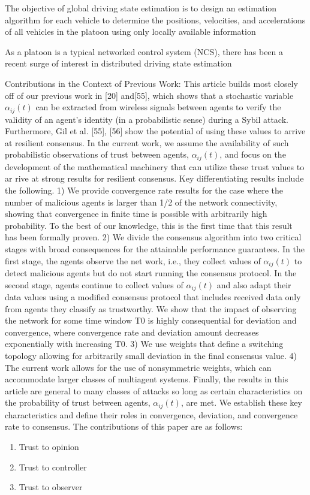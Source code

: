 \documentclass[letterpaper, 10pt, conference]{ieeeconf}  %
\begin{document}
 The objective of global driving state
 estimation is to design an estimation algorithm for each vehicle
 to determine the positions, velocities, and accelerations of all
 vehicles in the platoon using only locally available information

 As a platoon is a typical networked control system (NCS),
 there has been a recent surge of interest in distributed driving
 state estimation

    
Contributions in the Context of Previous Work: This article builds most closely off of our previous work in [20] and[55], which shows that a stochastic variable $\alpha_{ij}(t)$ can be extracted
 from wireless signals between agents to verify the validity of an
 agent's identity (in a probabilistic sense) during a Sybil attack.
 Furthermore, Gil et al. [55], [56] show the potential of using
 these values to arrive at resilient consensus. In the current work,
 we assume the availability of such probabilistic observations of
 trust between agents, $\alpha_{ij}(t)$, and focus on the development of the
 mathematical machinery that can utilize these trust values to ar
rive at strong results for resilient consensus. Key differentiating
 results include the following.
 1) We provide convergence rate results for the case where
 the number of malicious agents is larger than 1/2 of the
 network connectivity, showing that convergence in finite
 time is possible with arbitrarily high probability. To the
 best of our knowledge, this is the first time that this result
 has been formally proven.
 2) We divide the consensus algorithm into two critical stages with broad consequences for the attainable performance guarantees. In the first stage, the agents observe the net
work, i.e., they collect values of $\alpha_{ij}(t)$ to detect malicious agents but do not start running the consensus protocol.
 In the second stage, agents continue to collect values of
 $\alpha_{ij}(t)$ and also adapt their data values using a modified consensus protocol that includes received data only from agents they classify as trustworthy. We show that the
 impact of observing the network for some time window T0 is highly consequential for deviation and convergence,
 where convergence rate and deviation amount decreases
 exponentially with increasing T0.
 3) We use weights that define a switching topology allowing for arbitrarily small deviation in the final consensus value.
 4) The current work allows for the use of nonsymmetric weights, which can accommodate larger classes of multiagent systems.
 Finally, the results in this article are general to many classes
 of attacks so long as certain characteristics on the probability
 of trust between agents, $\alpha_{ij}(t)$, are met. We establish these key
 characteristics and define their roles in convergence, deviation,
 and convergence rate to consensus.
The contributions of this paper are as follows:
\begin{enumerate}
\item Trust to opinion
\item Trust to controller
\item Trust to observer

\end{enumerate}
\end{document}
